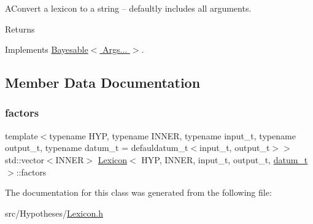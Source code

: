 A\+Convert a lexicon to a string -- defaultly includes all arguments. \begin{DoxyReturn}{Returns}

\end{DoxyReturn}


Implements \hyperlink{class_bayesable_afcea9b439bcf321d5354710d8861cb54}{Bayesable$<$ Args... $>$}.



\subsection{Member Data Documentation}
\mbox{\label{class_lexicon_ac70865eb23b1e23f53f21e1760adac00}} 
\subsubsection{\texorpdfstring{factors}{factors}}
{\footnotesize\ttfamily template$<$typename H\+YP, typename I\+N\+N\+ER, typename input\+\_\+t, typename output\+\_\+t, typename datum\+\_\+t = defauldatum\+\_\+t$<$input\+\_\+t, output\+\_\+t$>$$>$ \\
std\+::vector$<$I\+N\+N\+ER$>$ \hyperlink{class_lexicon}{Lexicon}$<$ H\+YP, I\+N\+N\+ER, input\+\_\+t, output\+\_\+t, \hyperlink{class_bayesable_a9f1a6c0cd7855550fa10b1a8f13a5867}{datum\+\_\+t} $>$\+::factors}



The documentation for this class was generated from the following file\+:\begin{DoxyCompactItemize}
\item 
src/\+Hypotheses/\hyperlink{_lexicon_8h}{Lexicon.\+h}\end{DoxyCompactItemize}
